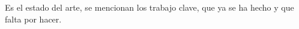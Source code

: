 Es el estado del arte, se mencionan los trabajo clave, que ya se ha hecho y que falta por hacer. \par
[Estudios relevantes, enfoques metodológicos existente, limitaciones de trabajos previos]

